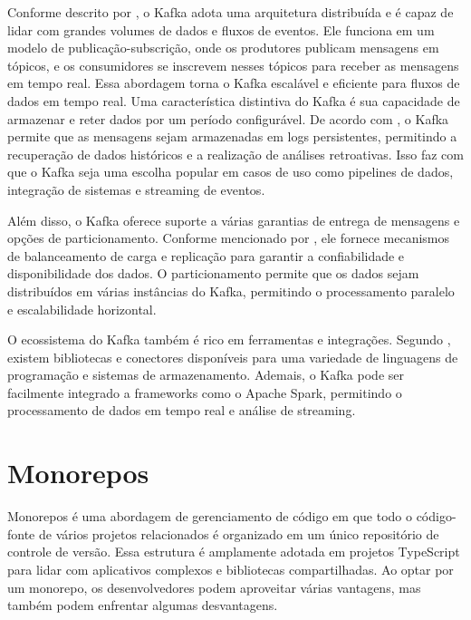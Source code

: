 Conforme descrito por \cite{Narkhede2018}, o Kafka adota uma
arquitetura distribuída e é capaz de lidar com grandes volumes de dados e fluxos de eventos. Ele
funciona em um modelo de publicação-subscrição, onde os produtores publicam mensagens em
tópicos, e os consumidores se inscrevem nesses tópicos para receber as mensagens em tempo
real. Essa abordagem torna o Kafka escalável e eficiente para fluxos de dados em tempo real.
Uma característica distintiva do Kafka é sua capacidade de armazenar e reter dados por
um período configurável. De acordo com \cite{Kreps2014}, o Kafka permite que as mensagens
sejam armazenadas em logs persistentes, permitindo a recuperação de dados históricos e a
realização de análises retroativas. Isso faz com que o Kafka seja uma escolha popular em casos
de uso como pipelines de dados, integração de sistemas e streaming de eventos.

Além disso, o Kafka oferece suporte a várias garantias de entrega de mensagens e opções
de particionamento. Conforme mencionado por \cite{sharma2017apache}, ele fornece mecanismos
de balanceamento de carga e replicação para garantir a confiabilidade e disponibilidade dos
dados. O particionamento permite que os dados sejam distribuídos em várias instâncias do Kafka,
permitindo o processamento paralelo e escalabilidade horizontal.

O ecossistema do Kafka também é rico em ferramentas e integrações. Segundo \cite{Garg2021}, existem bibliotecas e conectores disponíveis para uma variedade
de linguagens de programação e sistemas de armazenamento. Ademais, o Kafka pode ser
facilmente integrado a frameworks como o Apache Spark, permitindo o processamento de dados
em tempo real e análise de streaming.

\section{Monorepos}

Monorepos é uma abordagem de gerenciamento de código em que todo o código-fonte
de vários projetos relacionados é organizado em um único repositório de controle de versão. Essa
estrutura é amplamente adotada em projetos TypeScript para lidar com aplicativos complexos e
bibliotecas compartilhadas. Ao optar por um monorepo, os desenvolvedores podem aproveitar
várias vantagens, mas também podem enfrentar algumas desvantagens.

